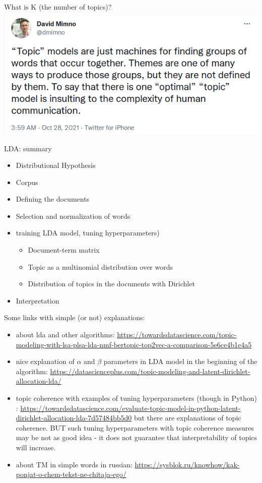 \documentclass[svgnames]{beamer}
\begin{document}
\begin{frame}{What is K (the number of topics)?}
\includegraphics[width=\textwidth]{dmimno-on-tm}
\end{frame}

\begin{frame}{LDA: summary}
    \begin{itemize}
        \item Distributional Hypothesis
        \item Corpus
        \item Defining the documents
        \item Selection and normalization of words
        \item training LDA model, tuning hyperparameters)
        \begin{itemize}
            \item Document-term matrix
            \item Topic as a multinomial distribution over words
            \item Distribution of topics in the documents with Dirichlet
        \end{itemize}
        \item Interpretation
    \end{itemize}
\end{frame}

\begin{frame}
Some links with simple (or not) explanations:
\begin{itemize}
\item about lda and other algorithms: \url{https://towardsdatascience.com/topic-modeling-with-lsa-plsa-lda-nmf-bertopic-top2vec-a-comparison-5e6ce4b1e4a5}
\item nice explanation of $\alpha$ and $\beta$ parameters in LDA model in the beginning of the algorithm: \url{https://datascienceplus.com/topic-modeling-and-latent-dirichlet-allocation-lda/}
\item topic coherence with examples of tuning hyperparameters (though in Python) : \url{https://towardsdatascience.com/evaluate-topic-model-in-python-latent-dirichlet-allocation-lda-7d57484bb5d0}
but there are explanations of topic coherence. BUT such tuning hyperparameters with topic coherence measures may be not as good idea -
it does not guarantee that interpretability of topics will increase.
\item about TM in simple words in russian: \url{https://sysblok.ru/knowhow/kak-ponjat-o-chem-tekst-ne-chitaja-ego/}
\end{itemize}
\end{frame}
\end{document}

